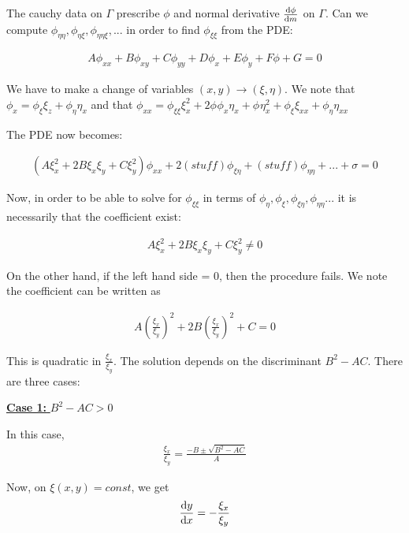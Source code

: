 \documentclass{article}
\theoremstyle{definition}
\begin{document}
The cauchy data on $\Gamma$ prescribe $\phi$ and normal derivative $\dv{\phi}{m}$ on $\Gamma$. Can we compute $\phi_{\eta \eta}, \phi_{\eta \xi }, \phi_{\eta \eta \xi},...$ in order to find $\phi_{\xi \xi }$ from the PDE:


\begin{align*}
A \phi_{xx} + B \phi_{xy} + C \phi_{yy} + D \phi_{x} + E \phi_{y} + F \phi + G = 0
\end{align*}

 We have to make a change of variables $(x,y) \to (\xi, \eta)$. We note that $\phi_x = \phi_\xi \xi_z + \phi_\eta \eta_x$ and that $\phi_{xx} = \phi_{\xi \xi} \xi_x^2 + 2 \phi_{} \phi_x \eta_x + \phi_{} \eta_x^2 + \phi_{\xi} \xi_{xx} + \phi_{\eta}\eta_{xx}$

The PDE now becomes:

\begin{align*}
(A \xi_x^2 + 2 B \xi_x \xi_y + C \xi_y^2) \phi_{xx} + 2 (stuff) \phi_{\xi \eta }+ (stuff)\phi_{\eta \eta} + ... + \sigma = 0
\end{align*}

Now, in order to be able to solve for $\phi_{\xi \xi }$ in terms of $\phi_{\eta}, \phi_{\xi}, \phi_{\xi \eta}, \phi_{\eta \eta} ...$ it is necessarily that the coefficient exist:

\begin{align*}
A \xi_x^2 + 2 B \xi_x \xi_y + C \xi_y^2 \neq 0
\end{align*}

On the other hand, if the left hand side = 0, then the procedure fails. We note the coefficient can be written as


\begin{align*}
A \left(\frac{\xi_x}{\xi_y}\right)^2 + 2 B \left(\frac{\xi_x}{\xi_y}\right)^2 + C = 0
\end{align*}

This is quadratic in $\frac{\xi_x}{\xi_y}$. The solution depends on the discriminant $B^2-AC$. There are three cases: 

\underline{\textbf{Case 1:} $B^2-AC>0$}

In this case, 
	\begin{align*}
	\frac{\xi_x}{\xi_y} = \frac{-B\pm \sqrt{B^2-AC}}{A}
	\end{align*}
	
	Now, on $\xi(x,y) = const$, we get 
	\begin{align*}
	\dv{y}{x} = - \frac{\xi_x}{\xi_y}
	\end{align*}
	
\end{document}

